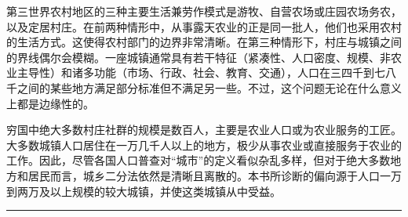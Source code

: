 \documentclass[12pt,a4paper]{article}
\begin{document}
第三世界农村地区的三种主要生活兼劳作模式是游牧、自营农场或庄园农场务农，以及定居村庄。在前两种情形中，从事露天农业的正是同一批人，他们也采用农村的生活方式。这使得农村部门的边界非常清晰。在第三种情形下，村庄与城镇之间的界线偶尔会模糊。一座城镇通常具有若干特征（紧凑性、人口密度、规模、非农业主导性）和诸多功能（市场、行政、社会、教育、交通），人口在三四千到七八千之间的某些地方满足部分标准但不满足另一些。不过，这个问题无论在什么意义上都是边缘性的。



穷国中绝大多数村庄社群的规模是数百人，主要是农业人口或为农业服务的工匠。大多数城镇人口居住在一万几千人以上的地方，极少从事农业或直接服务于农业的工作。因此，尽管各国人口普查对“城市”的定义看似杂乱多样，但对于绝大多数地方和居民而言，城乡二分法依然是清晰且离散的。本书所诊断的偏向源于人口一万到两万及以上规模的较大城镇，并使这类城镇从中受益。



\vspace{0.3em}

\noindent\rule{\textwidth}{0.4pt}

\vspace{0.3em}
\par{}
\end{document}
